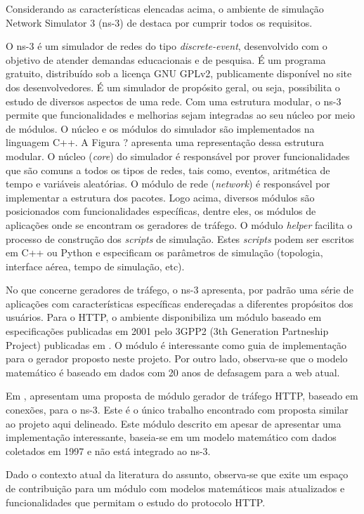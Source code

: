 Considerando as características elencadas acima, o ambiente de simulação Network Simulator 3 (ns-3) \cite{ns3-2021}  de destaca por cumprir todos os requisitos.

O ns-3 é um simulador de redes do tipo \textit{discrete-event}, desenvolvido com o objetivo de atender demandas educacionais e de pesquisa. É um programa gratuito, distribuído sob a licença GNU GPLv2, publicamente disponível no site dos desenvolvedores. É um simulador de propósito geral, ou seja, possibilita o estudo de diversos aspectos de uma rede. Com uma estrutura modular, o ns-3 permite que funcionalidades e melhorias sejam integradas ao seu núcleo por meio de módulos. O núcleo e os módulos do simulador são implementados na linguagem C++. A Figura ? apresenta uma representação dessa estrutura modular. O núcleo (\textit{core}) do simulador é responsável por prover funcionalidades que são comuns a todos os tipos de redes, tais como, eventos, aritmética de tempo e variáveis aleatórias. O módulo de rede (\textit{network}) é responsável por implementar a estrutura dos pacotes. Logo acima, diversos módulos são posicionados com funcionalidades específicas, dentre eles, os módulos de aplicações onde se encontram os geradores de tráfego. O módulo \textit{helper} facilita o processo de construção dos \textit{scripts} de simulação. Estes \textit{scripts} podem ser escritos em C++ ou Python e especificam os parâmetros de simulação (topologia, interface aérea, tempo de simulação, etc). 


No que concerne geradores de tráfego, o ns-3 apresenta, por padrão uma série de aplicações com características específicas endereçadas a diferentes propósitos dos usuários. Para o HTTP, o ambiente disponibiliza um módulo baseado em especificações publicadas em 2001 pelo 3GPP2 (3th Generation Partneship Project) publicadas em \cite{3GPP2-2001}. O módulo é interessante como guia de implementação para o gerador proposto neste projeto. Por outro lado, observa-se que o modelo matemático é baseado em dados com 20 anos de defasagem para a web atual.

Em \cite{Cheng2013},  apresentam uma proposta de módulo gerador de tráfego HTTP, baseado em conexões, para o ns-3. Este é o único trabalho encontrado com proposta similar ao projeto aqui delineado. Este módulo descrito em \cite{Cheng2013} apesar de apresentar uma implementação interessante, baseia-se em um modelo matemático com dados coletados em 1997 e não está integrado ao ns-3.

Dado o contexto atual da literatura do assunto, observa-se que exite um espaço de contribuição para um módulo com modelos matemáticos mais atualizados e funcionalidades que permitam o estudo do protocolo HTTP.

